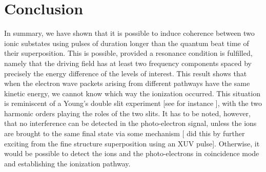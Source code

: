 \section{Conclusion}
\label{sec:org67cfded}
In summary, we have shown that it is possible to induce coherence
between two ionic substates using pulses of duration longer than the
quantum beat time of their superposition. This is possible, provided a
resonance condition is fulfilled, namely that the driving field has at
least two frequency components spaced by precisely the energy
difference of the levels of interest. This result shows that when the
electron wave packets arising from different pathways have the same
kinetic energy, we cannot know which way the ionization occurred. This
situation is reminiscent of a Young's double slit experiment [see for
instance \textcite{Arndt2005}], with the two harmonic orders playing
the roles of the two slits. It has to be noted, however, that no
interference can be detected in the photo-electron signal, unless the
ions are brought to the same final state via some mechanism [\eg
\textcite{Goulielmakis2010} did this by further exciting from the fine
structure superposition using an XUV pulse]. Otherwise, it would be
possible to detect the ions and the photo-electrons in coincidence
mode and establishing the ionization pathway.